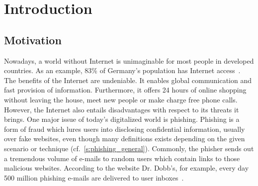 \section{Introduction}
\label{s:introduction}

\subsection{Motivation}
Nowadays, a world without Internet is unimaginable for most people in developed countries.
As an example, 83\% of Germany's population has Internet access~\cite{globalfinance2012internetusage}. 
The benefits of the Internet are undeniable.
It enables global communication and fast provision of information.
Furthermore, it offers 24 hours of online shopping without leaving the house, meet new people or make charge free phone calls.
However, the Internet also entails disadvantages with respect to its threats it brings.
One major issue of today's digitalized world is phishing. 
Phishing is a form of fraud which lures users into disclosing confidential information, usually over fake websites, even though many definitions exists depending on the given scenario or technique (cf.~\autoref{s:phishing_general}).
Commonly, the phisher sends out a tremendous volume of e-mails to random users which contain links to those malicious websites.
According to the website Dr. Dobb's, for example, every day 500 million phishing e-mails are delivered to user inboxes~\cite{drdobb2012email}.

